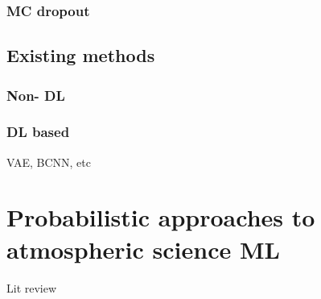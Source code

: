 \subsubsection{MC dropout}

\subsection{Existing methods}
\subsubsection{Non- DL}
\subsubsection{DL based}
VAE, BCNN, etc 

\section{Probabilistic approaches to atmospheric science ML}
Lit review

